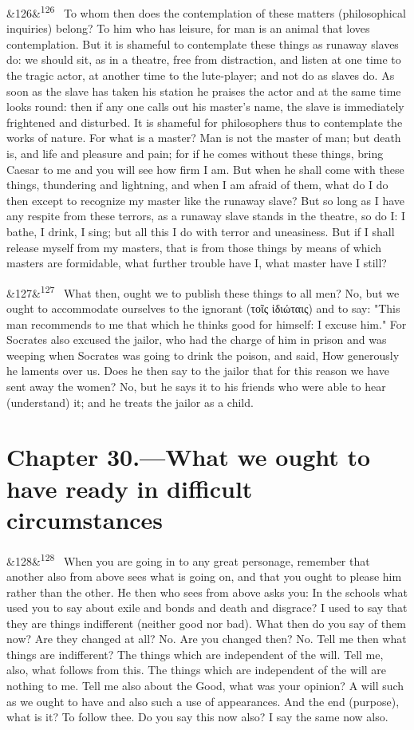 \documentclass[12pt]{article}
\newcommand{\para}[1][]{\par\noindent\ifx&#1&\else\textsuperscript{\footnotesize #1}~\fi}
\begin{document}
\para[126] To whom then does the contemplation of these matters (philosophical inquiries) belong? To him who has leisure, for man is an animal that loves contemplation. But it is shameful to contemplate these things as runaway slaves do: we should sit, as in a theatre, free from distraction, and listen at one time to the tragic actor, at another time to the lute-player; and not do as slaves do. As soon as the slave has taken his station he praises the actor and at the same time looks round: then if any one calls out his master's name, the slave is immediately frightened and disturbed. It is shameful for philosophers thus to contemplate the works of nature. For what is a master? Man is not the master of man; but death is, and life and pleasure and pain; for if he comes without these things, bring Caesar to me and you will see how firm I am. But when he shall come with these things, thundering and lightning, and when I am afraid of them, what do I do then except to recognize my master like the runaway slave? But so long as I have any respite from these terrors, as a runaway slave stands in the theatre, so do I: I bathe, I drink, I sing; but all this I do with terror and uneasiness. But if I shall release myself from my masters, that is from those things by means of which masters are formidable, what further trouble have I, what master have I still?

\para[127] What then, ought we to publish these things to all men? No, but we ought to accommodate ourselves to the ignorant (τοῖς ἰδιώταις) and to say: "This man recommends to me that which he thinks good for himself: I excuse him." For Socrates also excused the jailor, who had the charge of him in prison and was weeping when Socrates was going to drink the poison, and said, How generously he laments over us. Does he then say to the jailor that for this reason we have sent away the women? No, but he says it to his friends who were able to hear (understand) it; and he treats the jailor as a child.

\section*{Chapter 30.---What we ought to have ready in difficult circumstances}

\para[128] When you are going in to any great personage, remember that another also from above sees what is going on, and that you ought to please him rather than the other. He then who sees from above asks you: In the schools what used you to say about exile and bonds and death and disgrace? I used to say that they are things indifferent (neither good nor bad). What then do you say of them now? Are they changed at all? No. Are you changed then? No. Tell me then what things are indifferent? The things which are independent of the will. Tell me, also, what follows from this. The things which are independent of the will are nothing to me. Tell me also about the Good, what was your opinion? A will such as we ought to have and also such a use of appearances. And the end (purpose), what is it? To follow thee. Do you say this now also? I say the same now also.
\end{document}
